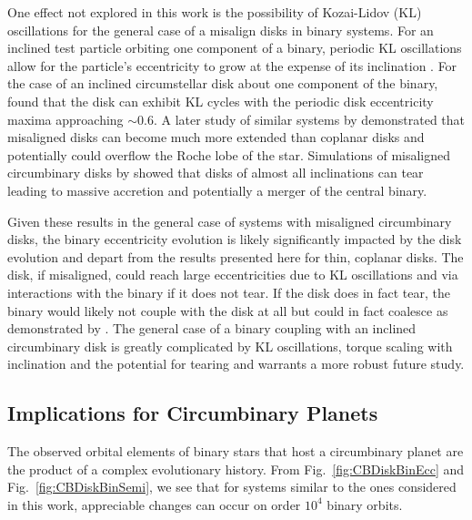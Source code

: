 One effect not explored in this work is the possibility of Kozai-Lidov (KL) oscillations for the general case of a misalign disks in binary systems.   
For an inclined test particle orbiting one component of a binary, periodic KL oscillations 
allow for the particle's eccentricity to grow at the expense of its inclination \citet{Kozai1962,Lidov1962}.  For the case of an inclined circumstellar disk about one 
component of the binary, \citet{Martin2014CB} found that the disk can exhibit KL cycles with the periodic disk eccentricity maxima approaching $\sim 0.6$.  A 
later study of similar systems by \citet{Lubow2015} demonstrated that misaligned disks can become much more extended than coplanar disks and 
potentially could overflow the Roche lobe of the star.  Simulations of misaligned circumbinary disks by \citet{Nixon2013} showed that disks of almost all 
inclinations can tear leading to massive accretion and potentially a merger of the central binary.

Given these results in the general case of systems with 
misaligned circumbinary disks, the binary eccentricity evolution is likely significantly impacted by the disk evolution and depart from the results presented here 
for thin, coplanar disks.  The disk, if misaligned, could reach large eccentricities due to KL oscillations and via interactions with the binary if it does not tear.  If 
the disk does in fact tear, the binary would likely not couple with the disk at all but could in fact coalesce as demonstrated by \citet{Nixon2013}.  The general 
case of a binary coupling with an inclined circumbinary disk is greatly complicated by KL oscillations, torque scaling with inclination and the potential for tearing 
and warrants a more robust future study.

\subsection{Implications for Circumbinary Planets} \label{CBDisk:sec:cbp_implications}

The observed orbital elements of binary stars that host a circumbinary planet are the product of a complex evolutionary history.  From Fig.~\ref{fig:CBDiskBinEcc} and 
Fig.~\ref{fig:CBDiskBinSemi}, we see that for systems similar to the ones considered in this work, appreciable changes can occur on order $10^4$ binary orbits.  

